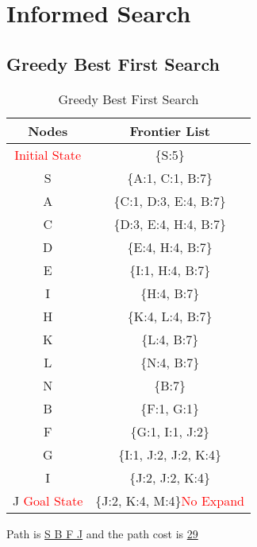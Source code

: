 \documentclass{article}
\begin{document}
	\section{Informed Search}
	\subsection{Greedy Best First Search}
    \begin{table}[H]
        \centering
        \caption{Greedy Best First Search}
        \label{tab:table1}
        \begin{tabular}{|c|c|}
            \toprule
            Nodes & Frontier List\\
            \midrule
            \textcolor{red}{Initial State} & \{S:5\}\\
            \hline
            S & \{A:1, C:1, B:7\}\\
            \hline
            A & \{C:1, D:3, E:4, B:7\}\\
            \hline
            C & \{D:3, E:4, H:4, B:7\}\\
            \hline
            D & \{E:4, H:4, B:7\}\\
            \hline
            E & \{I:1, H:4, B:7\}\\
            \hline
            I & \{H:4, B:7\}\\
            \hline
            H & \{K:4, L:4, B:7\}\\
            \hline
            K & \{L:4, B:7\}\\
            \hline
            L & \{N:4, B:7\}\\
            \hline
            N & \{B:7\}\\
            \hline
            B & \{F:1, G:1\}\\
            \hline
            F & \{G:1, I:1, J:2\}\\
            \hline
            G & \{I:1, J:2, J:2, K:4\}\\
            \hline
            I & \{J:2, J:2, K:4\}\\
            \hline
            J \textcolor{red}{Goal State} & \{J:2, K:4, M:4\}\textcolor{red}{No Expand}\\
            \hline

        \end{tabular}
    \end{table}
    \vspace{-.5pc}
        Path is \underline{S B F J} and the path cost is \underline{29}
\end{document}
